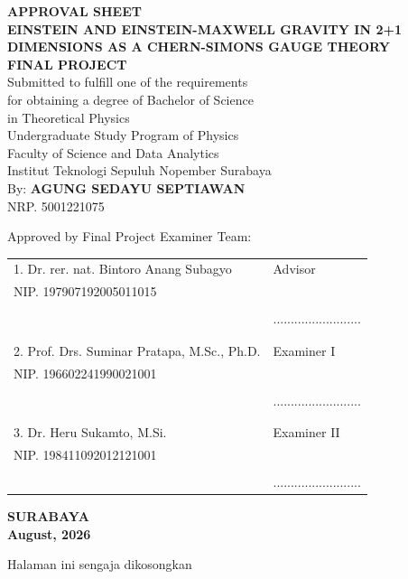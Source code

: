 \begin{center}
\large{\textbf{APPROVAL SHEET}} \\
\vspace{4mm}
\textbf{EINSTEIN AND EINSTEIN-MAXWELL GRAVITY IN 2+1 DIMENSIONS AS A CHERN-SIMONS GAUGE THEORY} \\
\vspace{4mm}
\textbf{FINAL PROJECT} \\
\vspace{4mm}
Submitted to fulfill one of the requirements \\
for obtaining a degree of Bachelor of Science \\
in Theoretical Physics \\
Undergraduate Study Program of Physics \\
Faculty of Science and Data Analytics\\
Institut Teknologi Sepuluh Nopember Surabaya \\
\vspace{4mm}
By: \textbf{AGUNG SEDAYU SEPTIAWAN} \\
\vspace{1mm}
NRP. 5001221075 \\
\vspace{4mm}
\begin{center}
    Approved by Final Project Examiner Team:
\end{center}

\vspace{4ex}

\begingroup
\setlength{\tabcolsep}{0pt}

\noindent
\begin{tabularx}{\textwidth}{X l}
    1. Dr. rer. nat. Bintoro Anang Subagyo      & Advisor \\
    NIP. 197907192005011015                      &  \\
    &  \\
    &.........................  \\
    &  \\
    &  \\
    2. Prof. Drs. Suminar Pratapa, M.Sc., Ph.D.  & Examiner I \\
    NIP. 196602241990021001  & \\
        &  \\
    & ......................... \\
        &  \\
    &  \\
    3. Dr. Heru Sukamto, M.Si. & Examiner II \\
    NIP. 198411092012121001   &  \\
    &  \\
        & .........................\\
\end{tabularx}
\endgroup
  \begin{center}
    \textbf{SURABAYA\\August, 2026}
\end{center}
\end{center}

\newpage
\thispagestyle{empty}
\vspace*{\fill}
    \begin{center}
    Halaman ini sengaja dikosongkan
    \end{center}
\vspace*{\fill}
\pagebreak